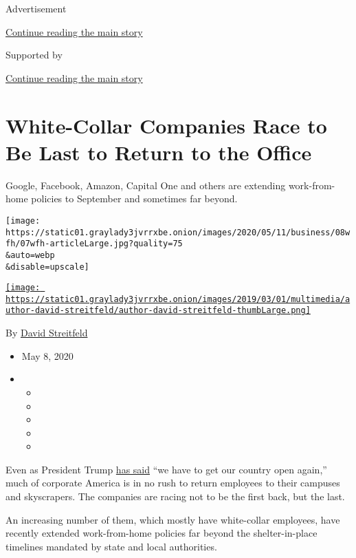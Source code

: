 Advertisement

\protect\hyperlink{after-top}{Continue reading the main story}

Supported by

\protect\hyperlink{after-sponsor}{Continue reading the main story}

\hypertarget{white-collar-companies-race-to-be-last-to-return-to-the-office}{%
\section{White-Collar Companies Race to Be Last to Return to the
Office}\label{white-collar-companies-race-to-be-last-to-return-to-the-office}}

Google, Facebook, Amazon, Capital One and others are extending
work-from-home policies to September and sometimes far beyond.

\texttt{[image: https://static01.graylady3jvrrxbe.onion/images/2020/05/11/business/08wfh/07wfh-articleLarge.jpg?quality=75\\\&auto=webp\\\&disable=upscale]}

\href{https://www.nytimes3xbfgragh.onion/by/david-streitfeld}{\texttt{[image: https://static01.graylady3jvrrxbe.onion/images/2019/03/01/multimedia/author-david-streitfeld/author-david-streitfeld-thumbLarge.png]}}

By \href{https://www.nytimes3xbfgragh.onion/by/david-streitfeld}{David
Streitfeld}

\begin{itemize}
\item
  May 8, 2020
\item
  \begin{itemize}
  \item
  \item
  \item
  \item
  \item
  \end{itemize}
\end{itemize}

Even as President Trump
\href{https://www.nytimes3xbfgragh.onion/2020/05/06/us/politics/trump-coronavirus-recovery.html}{has
said} ``we have to get our country open again,'' much of corporate
America is in no rush to return employees to their campuses and
skyscrapers. The companies are racing not to be the first back, but the
last.

An increasing number of them, which mostly have white-collar employees,
have recently extended work-from-home policies far beyond the
shelter-in-place timelines mandated by state and local authorities.

